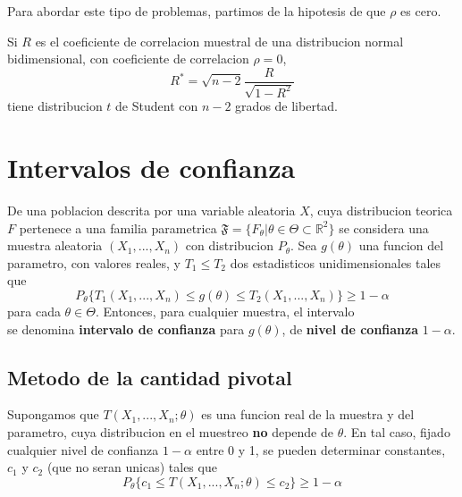\documentclass[10pt]{extarticle}
\newcommand{\R}{\mathbb{R}}
\newcommand{\<}{\langle}
\renewcommand{\>}{\rangle}
\theoremstyle{definition}
\begin{document}
Para abordar este tipo de problemas, partimos de la hipotesis de que $\rho$ es cero.

\begin{theorem*}
  Si $R$ es el coeficiente de correlacion muestral de una distribucion normal bidimensional, con coeficiente de correlacion $\rho=0$,
  \begin{equation*}
    R^* = \sqrt{n-2}\dfrac{R}{\sqrt{1-R^2}}
  \end{equation*}
  tiene distribucion $t$ de Student con $n-2$ grados de libertad.
\end{theorem*}


\newpage

\section{Intervalos de confianza}

De una poblacion descrita por una variable aleatoria $X$, cuya distribucion teorica $F$ pertenece a una familia parametrica $\mathfrak{F} = \{ F_\theta | \theta \in \Theta \subset \R^2\}$ se considera una muestra aleatoria $(X_1, ..., X_n)$ con distribucion $P_\theta$. Sea $g(\theta)$ una funcion del parametro, con valores reales, y $T_1 \leq T_2$ dos estadisticos unidimensionales tales que
\begin{equation*}
  P_\theta \{T_1(X_1,..., X_n) \leq g(\theta) \leq T_2(X_1, ..., X_n) \} \geq 1 - \alpha
\end{equation*}
para cada $\theta \in \Theta$. Entonces, para cualquier muestra, el intervalo
\begin{equation*}
  [T_1(x_1,..., x_n), T_2(x_1,...,x_n)]
\end{equation*}
se denomina \textbf{intervalo de confianza} para $g(\theta)$, de \textbf{nivel de confianza} $1-\alpha$.

\subsection*{Metodo de la cantidad pivotal}

Supongamos que $T(X_1, ..., X_n;\theta)$ es una funcion real de la muestra y del parametro, cuya distribucion en el muestreo \textbf{no} depende de $\theta$. En tal caso, fijado cualquier nivel de confianza $1-\alpha$ entre 0 y 1, se pueden determinar constantes, $c_1$ y $c_2$ (que no seran unicas) tales que
\begin{equation*}
  P_\theta \{c_1 \leq T(X_1,..., X_n; \theta) \leq  c_2\} \geq 1 - \alpha
\end{equation*}
\end{document}
